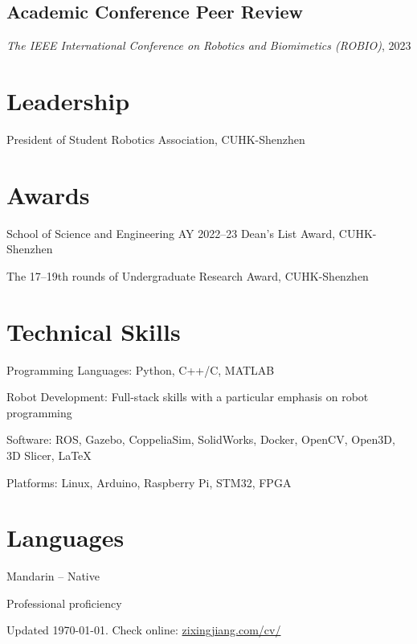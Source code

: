 \documentclass[11pt,letterpaper]{report}
\newcommand{\listitemspace}{0.25em}
\renewenvironment{itemize}
{\begin{list}{}{\setlength{\leftmargin}{0em}
			\setlength{\parskip}{0em}
			\setlength{\itemsep}{\listitemspace}
			\setlength{\parsep}{\listitemspace}}}
	{\end{list}}
\begin{document}
\subsection*{Academic Conference Peer Review}
\begin{itemize}
	\item \textit{The IEEE International Conference on Robotics and Biomimetics (ROBIO)}, 2023 
\end{itemize}


\section*{Leadership}
\begin{tablist}
	\item[2020--22]   \tab{}President of Student Robotics Association, CUHK-Shenzhen\\
\end{tablist}

\section*{Awards}
\begin{tablist}
	\item[2023]   \tab School of Science and Engineering AY 2022--23 Dean's List Award, CUHK-Shenzhen
	\item[2021--22]   \tab The 17--19th rounds of  Undergraduate Research Award, CUHK-Shenzhen
\end{tablist}

\section*{Technical Skills}
\begin{itemize}
	\item {Programming Languages}: Python, C++/C, MATLAB
	\item {Robot Development}: Full-stack skills with a particular emphasis on robot programming
	\item {Software}: ROS, Gazebo, CoppeliaSim, SolidWorks, Docker, OpenCV, Open3D, 3D Slicer, \LaTeX
	\item {Platforms}: Linux, Arduino, Raspberry Pi, STM32, FPGA
\end{itemize}
	
\section*{Languages}
\begin{tablist}
	\item[Chinese] \tab Mandarin -- Native
	\item[English] \tab Professional proficiency
\end{tablist}
	
	\begin{center}
		\vfill
		Updated \monthyeardate\today. Check online:  \href{https://www.zixingjiang.com/cv/}{zixingjiang.com/cv/}
	\end{center}
	
\end{document}
